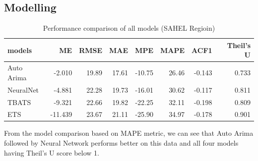 \documentclass[11pt,oneside,a4paper]{reedthesis}
\newenvironment{Shaded}{\begin{snugshade}}{\end{snugshade}}
\newcommand{\KeywordTok}[1]{\textcolor[rgb]{0.13,0.29,0.53}{\textbf{#1}}}
\newcommand{\DataTypeTok}[1]{\textcolor[rgb]{0.13,0.29,0.53}{#1}}
\newcommand{\DecValTok}[1]{\textcolor[rgb]{0.00,0.00,0.81}{#1}}
\newcommand{\StringTok}[1]{\textcolor[rgb]{0.31,0.60,0.02}{#1}}
\newcommand{\CommentTok}[1]{\textcolor[rgb]{0.56,0.35,0.01}{\textit{#1}}}
\newcommand{\OperatorTok}[1]{\textcolor[rgb]{0.81,0.36,0.00}{\textbf{#1}}}
\newcommand{\NormalTok}[1]{#1}
\begin{document}
\subsection{Modelling}\label{modelling-2}
\begin{Shaded}
\end{Shaded}
\begin{table}[H]

\caption{\label{tab:unnamed-chunk-110}Performance comparison of all models (SAHEL Regioin)}
\centering
\fontsize{12}{14}\selectfont
\begin{tabular}[t]{lrrrrrrr}
\toprule
models & ME & RMSE & MAE & MPE & MAPE & ACF1 & Theil's U\\
\midrule
Auto Arima & -2.010 & 19.89 & 17.61 & -10.75 & 26.46 & -0.143 & 0.733\\
NeuralNet & -4.881 & 22.28 & 19.73 & -16.01 & 30.62 & -0.117 & 0.811\\
TBATS & -9.321 & 22.66 & 19.82 & -22.25 & 32.11 & -0.198 & 0.809\\
ETS & -11.439 & 23.67 & 21.11 & -25.90 & 34.97 & -0.178 & 0.901\\
\bottomrule
\end{tabular}
\end{table}
From the model comparison based on MAPE metric, we can see that Auto
Arima followed by Neural Network performs better on this data and all
four models having Theil's U score below 1.
\end{document}
